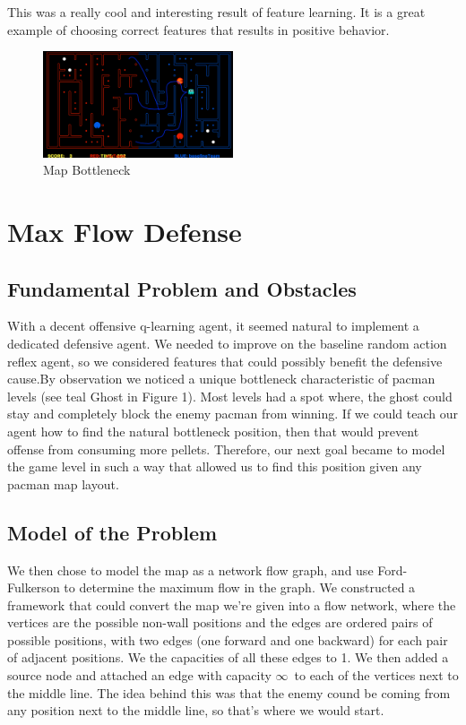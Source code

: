 \documentclass[11pt]{article}
\begin{document}
This was a really cool and interesting result of feature learning. It is a great example of
choosing correct features that results in positive behavior.

\begin{figure}
\centering
\includegraphics[width=0.5\textwidth]{report_fig1.png}
\caption{\label{fig:1}Map Bottleneck}
\end{figure}
\section{Max Flow Defense}

\subsection{Fundamental Problem and Obstacles}
With a decent offensive q-learning agent, it seemed natural to implement
a dedicated defensive agent. We needed to improve on the baseline random
action reflex agent, so we considered features that could possibly benefit
the defensive cause.By observation we noticed a unique bottleneck characteristic of
pacman levels (see teal Ghost in Figure 1). Most levels had a spot where, the ghost
could stay and completely block the enemy pacman from winning.
If we could teach our agent how to find the natural bottleneck position, then that would
prevent offense from consuming more pellets.
Therefore, our next goal became to model the game level in such a way that
allowed us to find this position given any pacman map layout.

\subsection{Model of the Problem}


We then chose to model the map as a network flow graph, and use Ford-Fulkerson
to determine the maximum flow in the graph. We constructed a framework that could
convert the map we're given into a flow network, where the vertices are the possible
non-wall positions and the edges are ordered pairs of possible positions, with two edges
(one forward and one backward) for each pair of adjacent positions. We the capacities of
all these edges to 1. We then added a source node and attached an edge with capacity
$\infty$\ to each of the vertices next to the middle line. The idea behind this was
that the enemy cound be coming from any position next to the middle line, so that's
where we would start.
\end{document}
